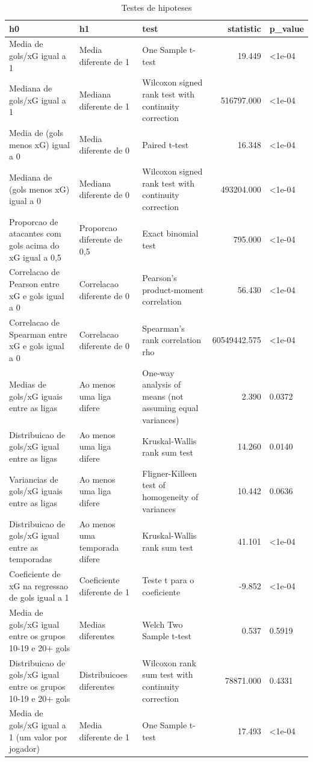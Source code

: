 \begin{table}

\caption{\label{tab:testes_g10}Testes de hipoteses}
\centering
\begin{tabular}[t]{lllrl}
\toprule
h0 & h1 & test & statistic & p\_value\\
\midrule
Media de gols/xG igual a 1 & Media diferente de 1 & One Sample t-test & 19.449 & <1e-04\\
Mediana de gols/xG igual a 1 & Mediana diferente de 1 & Wilcoxon signed rank test with continuity correction & 516797.000 & <1e-04\\
Media de (gols menos xG) igual a 0 & Media diferente de 0 & Paired t-test & 16.348 & <1e-04\\
Mediana de (gols menos xG) igual a 0 & Mediana diferente de 0 & Wilcoxon signed rank test with continuity correction & 493204.000 & <1e-04\\
Proporcao de atacantes com gols acima do xG igual a 0,5 & Proporcao diferente de 0,5 & Exact binomial test & 795.000 & <1e-04\\
\addlinespace
Correlacao de Pearson entre xG e gols igual a 0 & Correlacao diferente de 0 & Pearson's product-moment correlation & 56.430 & <1e-04\\
Correlacao de Spearman entre xG e gols igual a 0 & Correlacao diferente de 0 & Spearman's rank correlation rho & 60549442.575 & <1e-04\\
Medias de gols/xG iguais entre as ligas & Ao menos uma liga difere & One-way analysis of means (not assuming equal variances) & 2.390 & 0.0372\\
Distribuicao de gols/xG igual entre as ligas & Ao menos uma liga difere & Kruskal-Wallis rank sum test & 14.260 & 0.0140\\
Variancias de gols/xG iguais entre as ligas & Ao menos uma liga difere & Fligner-Killeen test of homogeneity of variances & 10.442 & 0.0636\\
\addlinespace
Distribuicao de gols/xG igual entre as temporadas & Ao menos uma temporada difere & Kruskal-Wallis rank sum test & 41.101 & <1e-04\\
Coeficiente de xG na regressao de gols igual a 1 & Coeficiente diferente de 1 & Teste t para o coeficiente & -9.852 & <1e-04\\
Media de gols/xG igual entre os grupos 10-19 e 20+ gols & Medias diferentes & Welch Two Sample t-test & 0.537 & 0.5919\\
Distribuicao de gols/xG igual entre os grupos 10-19 e 20+ gols & Distribuicoes diferentes & Wilcoxon rank sum test with continuity correction & 78871.000 & 0.4331\\
Media de gols/xG igual a 1 (um valor por jogador) & Media diferente de 1 & One Sample t-test & 17.493 & <1e-04\\
\bottomrule
\end{tabular}
\end{table}

